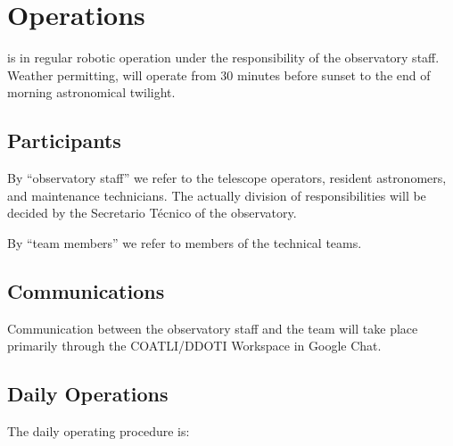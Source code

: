 \chapter{Operations}
\label{chapter:operations}

{\projectname} is in regular robotic operation under the responsibility of the observatory staff. Weather permitting, {\projectname} will operate from 30 minutes before sunset to the end of morning astronomical twilight.

\section{Participants}

By “observatory staff” we refer to the telescope operators, resident astronomers, and maintenance technicians. The actually division of responsibilities will be decided by the Secretario Técnico of the observatory.

By “team members” we refer to members of the {\projectname} technical teams.

\section{Communications}

Communication between the observatory staff and the team will take place primarily through the COATLI/DDOTI Workspace in Google Chat.

\section{Daily Operations}

The daily operating procedure is:

